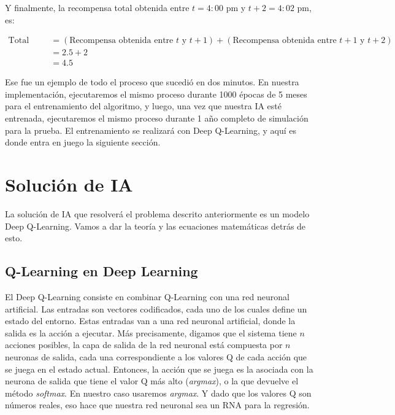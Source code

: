 \documentclass[
]{book}
\begin{document}
Y finalmente, la recompensa total obtenida entre \(t = 4:00\) pm y \(t+2 = 4:02\) pm, es:

\begin{align*}
    \textrm{Total Reward}
    & = (\textrm{Recompensa obtenida entre $t$ y $t+1$}) + (\textrm{Recompensa obtenida entre $t+1$ y $t+2$}) \\
    &  = 2.5 + 2 \\
    & = 4.5
\end{align*}

Ese fue un ejemplo de todo el proceso que sucedió en dos minutos. En nuestra implementación, ejecutaremos el mismo proceso durante 1000 épocas de 5 meses para el entrenamiento del algoritmo, y luego, una vez que nuestra IA esté entrenada, ejecutaremos el mismo proceso durante 1 año completo de simulación para la prueba. El entrenamiento se realizará con Deep Q-Learning, y aquí es donde entra en juego la siguiente sección.

\hypertarget{soluciuxf3n-de-ia}{%
\section{Solución de IA}\label{soluciuxf3n-de-ia}}

La solución de IA que resolverá el problema descrito anteriormente es un modelo Deep Q-Learning. Vamos a dar la teoría y las ecuaciones matemáticas detrás de esto.

\hypertarget{q-learning-en-deep-learning}{%
\subsection{Q-Learning en Deep Learning}\label{q-learning-en-deep-learning}}

El Deep Q-Learning consiste en combinar Q-Learning con una red neuronal artificial. Las entradas son vectores codificados, cada uno de los cuales define un estado del entorno. Estas entradas van a una red neuronal artificial, donde la salida es la acción a ejecutar. Más precisamente, digamos que el sistema tiene \(n\) acciones posibles, la capa de salida de la red neuronal está compuesta por \(n\) neuronas de salida, cada una correspondiente a los valores Q de cada acción que se juega en el estado actual. Entonces, la acción que se juega es la asociada con la neurona de salida que tiene el valor Q más alto (\emph{argmax}), o la que devuelve el método \emph{softmax}. En nuestro caso usaremos \emph{argmax}. Y dado que los valores Q son números reales, eso hace que nuestra red neuronal sea un RNA para la regresión.
\end{document}
